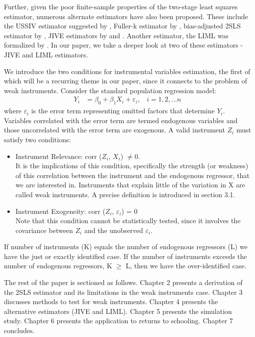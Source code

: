 \par Further, given the poor finite-sample properties of the two-stage least squares estimator, numerous alternate estimators have also been proposed. These include the USSIV estimator suggested by \cite{angrist1995split}, Fuller-k estimator by \cite{fuller1977some}, bias-adjusted 2SLS estimator by \cite{donald2001choosing}, JIVE estimators by \cite{angrist1999jackknife} and \cite{blomquist1999small}. Another estimator, the LIML was formalized by \cite{anderson1949estimation}. In our paper, we take a deeper look at two of these estimators - JIVE and LIML estimators.

\par We introduce the two conditions for instrumental variables estimation, the first of which will be a recurring theme in our paper, since it connects to the problem of weak instruments. Consider the standard population regression model:
\begin{align*}
Y_i &= \beta_0 + \beta_1X_i + \varepsilon_i, \: \: \: \: i = 1,2,...n 
\end{align*}
where $\varepsilon_i$ is the error term representing omitted factors that determine $Y_i$. Variables correlated with the error term are termed endogenous variables and those uncorrelated with the error term are exogenous. A valid instrument $Z_i$ must satisfy two conditions:
\begin{itemize}
    \item Instrument Relevance: corr ($Z_i$, $X_i$) $\neq 0.$\\
    It is the implications of this condition, specifically the strength (or weakness) of this correlation between the instrument and the endogenous regressor, that we are interested in. Instruments that explain little of the variation in X are called weak instruments. A precise definition is introduced in section 3.1.
    \item Instrument Exogeneity: corr ($Z_i$, $\varepsilon_i$) = 0\\
    Note that this condition cannot be statistically tested, since it involves the covariance between $Z_i$ and the unobserved $\varepsilon_i$.
\end{itemize}
\par If number of instruments (K) equals the number
of endogenous regressors (L) we have the just or exactly identified case.  If the number of instruments exceeds the number of endogenous regressors, K $\geq$ L, then we have the over-identified case. 



\par The rest of the paper is sectioned as follows. Chapter 2 presents a derivation of the 2SLS estimator and its limitations in the weak instruments case. Chapter 3 discusses methods to test for weak instruments. Chapter 4 presents the alternative estimators (JIVE and LIML). Chapter 5 presents the simulation study. Chapter 6 presents the application to returns to schooling. Chapter 7 concludes.